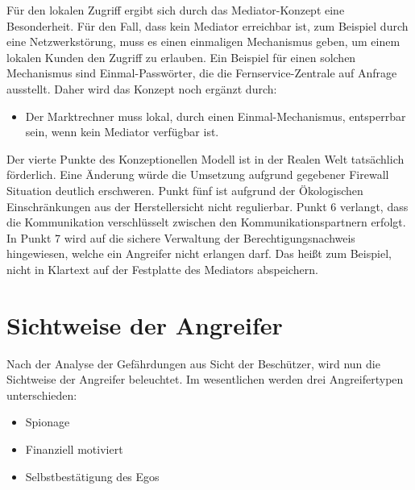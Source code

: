 \documentclass[11pt,a4paper]{report}
\begin{document}
Für den lokalen Zugriff ergibt sich durch das Mediator-Konzept eine Besonderheit. Für den Fall, dass kein Mediator erreichbar ist, zum Beispiel durch eine Netzwerkstörung, muss es einen einmaligen Mechanismus geben, um einem lokalen Kunden den Zugriff zu erlauben. Ein Beispiel für einen solchen Mechanismus sind Einmal-Passwörter, die die Fernservice-Zentrale auf Anfrage ausstellt. Daher wird das Konzept noch ergänzt durch:

\begin{itemize}[leftmargin=*]
\item Der Marktrechner muss lokal, durch einen Einmal-Mechanismus, entsperrbar sein, wenn kein Mediator verfügbar ist.
\end{itemize}

Der vierte Punkte des Konzeptionellen Modell ist in der Realen Welt tatsächlich förderlich. Eine Änderung würde die Umsetzung aufgrund gegebener Firewall Situation deutlich erschweren. Punkt fünf ist aufgrund der Ökologischen Einschränkungen aus der Herstellersicht nicht regulierbar. Punkt 6 verlangt, dass die Kommunikation verschlüsselt zwischen den Kommunikationspartnern erfolgt. In Punkt 7 wird auf die sichere Verwaltung der Berechtigungsnachweis hingewiesen, welche ein Angreifer nicht erlangen darf. Das heißt zum Beispiel, nicht in Klartext auf der Festplatte des Mediators abspeichern.

\section{Sichtweise der Angreifer}

Nach der Analyse der Gefährdungen aus Sicht der Beschützer, wird nun die Sichtweise der Angreifer beleuchtet. Im wesentlichen werden drei Angreifertypen unterschieden:

\begin{itemize}[leftmargin=*]
\item Spionage
\item Finanziell motiviert
\item Selbstbestätigung des Egos
\end{itemize}
\end{document}
